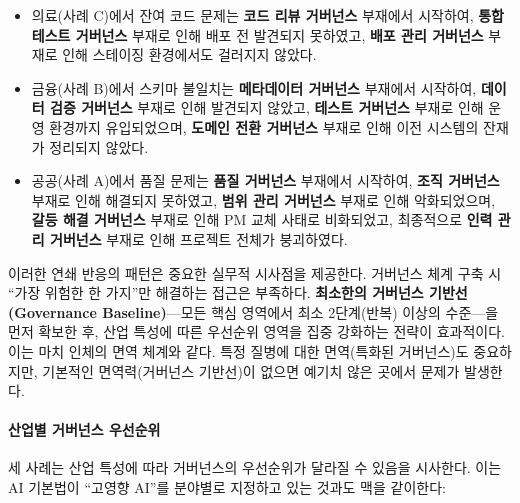 \begin{itemize}
    \item 의료(사례 C)에서 잔여 코드 문제는 \textbf{코드 리뷰 거버넌스} 부재에서 시작하여, \textbf{통합 테스트 거버넌스} 부재로 인해 배포 전 발견되지 못하였고, \textbf{배포 관리 거버넌스} 부재로 인해 스테이징 환경에서도 걸러지지 않았다.
    \item 금융(사례 B)에서 스키마 불일치는 \textbf{메타데이터 거버넌스} 부재에서 시작하여, \textbf{데이터 검증 거버넌스} 부재로 인해 발견되지 않았고, \textbf{테스트 거버넌스} 부재로 인해 운영 환경까지 유입되었으며, \textbf{도메인 전환 거버넌스} 부재로 인해 이전 시스템의 잔재가 정리되지 않았다.
    \item 공공(사례 A)에서 품질 문제는 \textbf{품질 거버넌스} 부재에서 시작하여, \textbf{조직 거버넌스} 부재로 인해 해결되지 못하였고, \textbf{범위 관리 거버넌스} 부재로 인해 악화되었으며, \textbf{갈등 해결 거버넌스} 부재로 인해 PM 교체 사태로 비화되었고, 최종적으로 \textbf{인력 관리 거버넌스} 부재로 인해 프로젝트 전체가 붕괴하였다.
\end{itemize}

이러한 연쇄 반응의 패턴은 중요한 실무적 시사점을 제공한다. 거버넌스 체계 구축 시 ``가장 위험한 한 가지''만 해결하는 접근은 부족하다. \textbf{최소한의 거버넌스 기반선(Governance Baseline)}---모든 핵심 영역에서 최소 2단계(반복) 이상의 수준---을 먼저 확보한 후, 산업 특성에 따른 우선순위 영역을 집중 강화하는 전략이 효과적이다. 이는 마치 인체의 면역 체계와 같다. 특정 질병에 대한 면역(특화된 거버넌스)도 중요하지만, 기본적인 면역력(거버넌스 기반선)이 없으면 예기치 않은 곳에서 문제가 발생한다.

\paragraph{산업별 거버넌스 우선순위}
세 사례는 산업 특성에 따라 거버넌스의 우선순위가 달라질 수 있음을 시사한다. 이는 AI 기본법이 ``고영향 AI''를 분야별로 지정하고 있는 것과도 맥을 같이한다:

